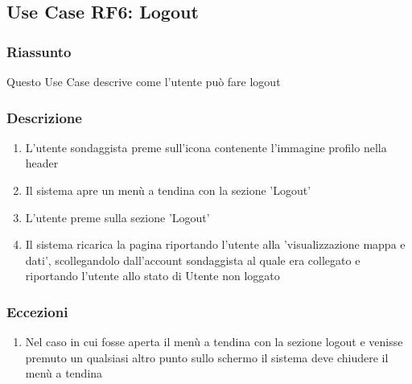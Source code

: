     \subsection{Use Case RF6: Logout}
        \subsubsection{Riassunto}
            Questo Use Case descrive come l'utente può fare logout
        \subsubsection{Descrizione}
            \begin{enumerate}
                \item L'utente sondaggista preme sull'icona contenente l'immagine profilo nella header
                \item Il sistema apre un menù a tendina con la sezione 'Logout'
                \item L'utente preme sulla sezione 'Logout'
                \item Il sistema ricarica la pagina riportando l'utente alla 'visualizzazione mappa e dati', scollegandolo dall'account sondaggista al quale era collegato e riportando l'utente allo stato di Utente non loggato
            \end{enumerate}
        \subsubsection{Eccezioni}
            \begin{enumerate}
                \item Nel caso in cui fosse aperta il menù a tendina con la sezione logout e venisse premuto un qualsiasi altro punto sullo schermo il sistema deve chiudere il menù a tendina
            \end{enumerate}
